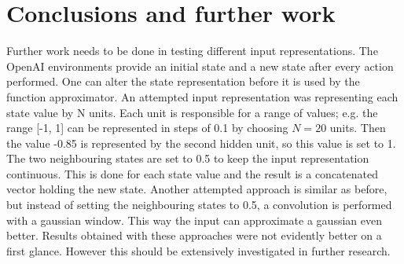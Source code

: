 
\section{Conclusions and further work}
Further work needs to be done in testing different input representations. The OpenAI environments provide an initial state and a new state after every action performed. One can alter the state representation before it is used by the function approximator. An attempted input representation was representing each state value by N units. Each unit is responsible for a range of values; e.g. the range [-1, 1] can be represented in steps of 0.1 by choosing $N=20$ units. Then the value -0.85 is represented by the second hidden unit, so this value is set to 1. The two neighbouring states are set to 0.5 to keep the input representation continuous. This is done for each state value and the result is a concatenated vector holding the new state. Another attempted approach is similar as before, but instead of setting the neighbouring states to 0.5, a convolution is performed with a gaussian window. This way the input can approximate a gaussian even better. Results obtained with these approaches were not evidently better on a first glance. However this should be extensively investigated in further research. 
